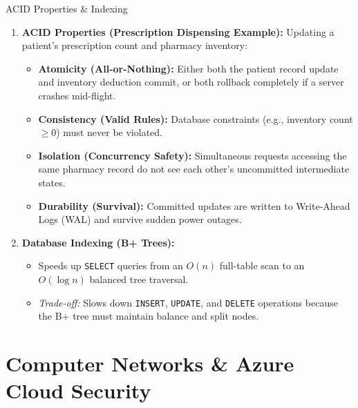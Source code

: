 \documentclass[11pt,a4paper]{article}
\begin{document}
\begin{techbox}{ACID Properties \& Indexing}
\begin{enumerate}
    \item \textbf{ACID Properties (Prescription Dispensing Example):}
    Updating a patient's prescription count and pharmacy inventory:
    \begin{itemize}
        \item \textbf{Atomicity (All-or-Nothing):} Either both the patient record update and inventory deduction commit, or both rollback completely if a server crashes mid-flight.
        \item \textbf{Consistency (Valid Rules):} Database constraints (e.g., inventory count $\ge 0$) must never be violated.
        \item \textbf{Isolation (Concurrency Safety):} Simultaneous requests accessing the same pharmacy record do not see each other's uncommitted intermediate states.
        \item \textbf{Durability (Survival):} Committed updates are written to Write-Ahead Logs (WAL) and survive sudden power outages.
    \end{itemize}
    \item \textbf{Database Indexing (B+ Trees):}
    \begin{itemize}
        \item Speeds up \texttt{SELECT} queries from an $O(n)$ full-table scan to an $O(\log n)$ balanced tree traversal.
        \item \textit{Trade-off:} Slows down \texttt{INSERT}, \texttt{UPDATE}, and \texttt{DELETE} operations because the B+ tree must maintain balance and split nodes.
    \end{itemize}
\end{enumerate}
\end{techbox}

\section{Computer Networks \& Azure Cloud Security}
\end{document}
